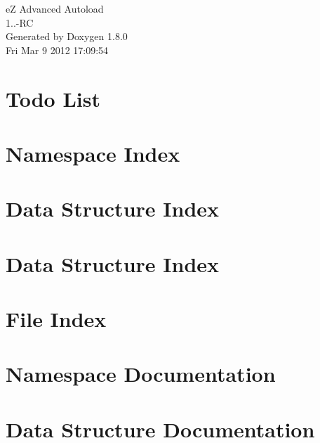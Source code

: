 \documentclass{book}
\begin{document}
\hypersetup{pageanchor=false,citecolor=blue}
\begin{titlepage}
\vspace*{7cm}
\begin{center}
{\Large e\-Z Advanced Autoload \\[1ex]\large 1..-\/\-R\-C }\\
\vspace*{1cm}
{\large Generated by Doxygen 1.8.0}\\
\vspace*{0.5cm}
{\small Fri Mar 9 2012 17:09:54}\\
\end{center}
\end{titlepage}
\clearemptydoublepage
{}
\tableofcontents
\clearemptydoublepage
{}
\hypersetup{pageanchor=true,citecolor=blue}
\chapter{Todo List}
\label{todo}
\hypertarget{todo}{}

\chapter{Namespace Index}

\chapter{Data Structure Index}

\chapter{Data Structure Index}

\chapter{File Index}

\chapter{Namespace Documentation}








\chapter{Data Structure Documentation}





\end{document}
